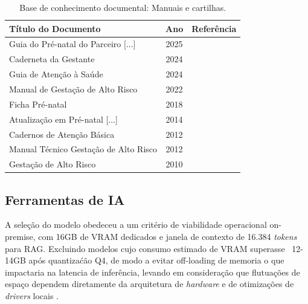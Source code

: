 \documentclass[12pt]{article}
\begin{document}
\begin{table}[H]
  \centering
  \caption{Base de conhecimento documental: Manuais e cartilhas.}
  \label{tab:cartilhas_sus}
  \footnotesize
  \begin{tabular}{l c l}
    \toprule
        \textbf{Título do Documento} & \textbf{Ano} & \textbf{Referência} \\ 
    \midrule
        Guia do Pré-natal do Parceiro [...]     & 2025 & \cite{GuiaPreNatalParceiro2025} \\
        Caderneta da Gestante                   & 2024 & \cite{CadernetaGestante2024} \\
        Guia de Atenção à Saúde                 & 2024 & \cite{GuiaAtencaoGestanteMG2024} \\
        Manual de Gestação de Alto Risco        & 2022 & \cite{ManualAltoRisco2022} \\
        Ficha Pré-natal                         & 2018 & \cite{FichaPreNatal2018} \\
        Atualização em Pré-natal [...]          & 2014 & \cite{AtualizacaoPreNatalSC2014} \\
        Cadernos de Atenção Básica              & 2012 & \cite{CadernosAtencaoBasica32} \\
        Manual Técnico Gestação de Alto Risco   & 2012 & \cite{ManualAltoRisco2012} \\
        Gestação de Alto Risco                  & 2010 & \cite{ManualAltoRisco2010} \\
    \bottomrule
  \end{tabular}
\end{table}

\subsection{Ferramentas de IA}

A seleção do modelo obedeceu a um critério de viabilidade operacional on-premise, com 16GB de VRAM dedicados e janela de contexto de 16.384 \textit{tokens} para RAG.
Excluindo modelos cujo consumo estimado de VRAM superasse ~12-14GB após quantizaćão Q4, de modo a evitar off-loading de memoria o que impactaria na latencia de inferência, levando em consideração que flutuações de espaço dependem diretamente da arquitetura de \textit{hardware} e de otimizações de \textit{drivers} locais \cite{VRAMCalculator}.
\end{document}
